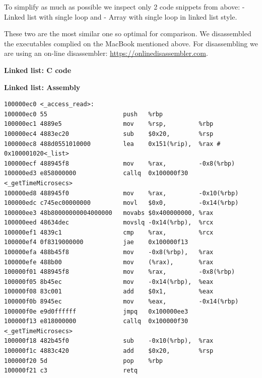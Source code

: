 To simplify as much as possible we inspect only 2 code snippets from
above: - Linked list with single loop and - Array with single loop in
linked list style.

These two are the most similar one so optimal for comparison. We
disassembled the executables complied on the MacBook mentioned above.
For disassembling we are using an on-line disassembler:
\url{https://onlinedisassembler.com}.

\textbf{Linked list: C code}

\begin{Shaded}
\begin{Highlighting}[]
  
   \NormalTok{l * cur = &list[}\NormalTok{];}
   
  \NormalTok{(} 
    \NormalTok{(}\NormalTok{)cur->pad[}\NormalTok{];}
  \NormalTok{\}}
   
\NormalTok{\}}
\end{Highlighting}
\end{Shaded}

\textbf{Linked list: Assembly}

\begin{verbatim}
100000ec0 <_access_read>:
100000ec0 55                     push   %rbp
100000ec1 4889e5                 mov    %rsp,         %rbp
100000ec4 4883ec20               sub    $0x20,        %rsp
100000ec8 488d0551010000         lea    0x151(%rip),  %rax # 0x100001020<_list>
100000ecf 488945f8               mov    %rax,         -0x8(%rbp)
100000ed3 e858000000             callq  0x100000f30   <_getTimeMicrosecs>
100000ed8 488945f0               mov    %rax,         -0x10(%rbp)
100000edc c745ec00000000         movl   $0x0,         -0x14(%rbp)
100000ee3 48b80000000004000000   movabs $0x400000000, %rax
100000eed 48634dec               movslq -0x14(%rbp),  %rcx
100000ef1 4839c1                 cmp    %rax,         %rcx
100000ef4 0f8319000000           jae    0x100000f13
100000efa 488b45f8               mov    -0x8(%rbp),   %rax
100000efe 488b00                 mov    (%rax),       %rax
100000f01 488945f8               mov    %rax,         -0x8(%rbp)
100000f05 8b45ec                 mov    -0x14(%rbp),  %eax
100000f08 83c001                 add    $0x1,         %eax
100000f0b 8945ec                 mov    %eax,         -0x14(%rbp)
100000f0e e9d0ffffff             jmpq   0x100000ee3
100000f13 e818000000             callq  0x100000f30   <_getTimeMicrosecs>
100000f18 482b45f0               sub    -0x10(%rbp),  %rax
100000f1c 4883c420               add    $0x20,        %rsp
100000f20 5d                     pop    %rbp
100000f21 c3                     retq   
\end{verbatim}

